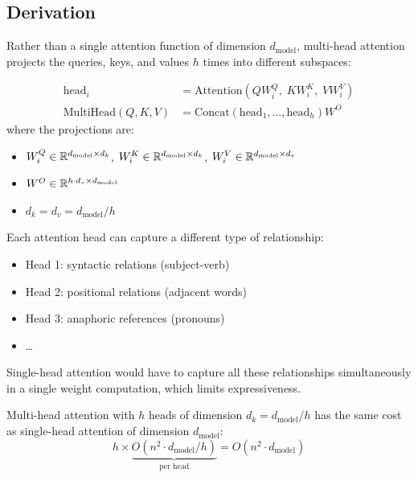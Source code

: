 \subsection{Derivation}

Rather than a single attention function of dimension $d_{\text{model}}$,
multi-head attention projects the queries, keys, and values $h$ times into
different subspaces:

\begin{keyformulas}[title=\textbf{Multi-head attention}]
\begin{align}
\text{head}_i &= \text{Attention}(Q W_i^Q,\; K W_i^K,\; V W_i^V)
\label{eq:head-i} \\
\text{MultiHead}(Q, K, V) &= \text{Concat}(\text{head}_1, \ldots, \text{head}_h) W^O
\label{eq:multi-head}
\end{align}
where the projections are:
\begin{itemize}
  \item $W_i^Q \in \mathbb{R}^{d_{\text{model}} \times d_k}$, \quad
        $W_i^K \in \mathbb{R}^{d_{\text{model}} \times d_k}$, \quad
        $W_i^V \in \mathbb{R}^{d_{\text{model}} \times d_v}$
  \item $W^O \in \mathbb{R}^{h \cdot d_v \times d_{\text{model}}}$
  \item $d_k = d_v = d_{\text{model}} / h$
\end{itemize}
\end{keyformulas}

\begin{intuition}[title=\textbf{Why multiple heads?}]
Each attention head can capture a different type of relationship:
\begin{itemize}
  \item Head 1: syntactic relations (subject-verb)
  \item Head 2: positional relations (adjacent words)
  \item Head 3: anaphoric references (pronouns)
  \item \ldots
\end{itemize}
Single-head attention would have to capture all these relationships
simultaneously in a single weight computation, which limits expressiveness.
\end{intuition}

\begin{remark}
Multi-head attention with $h$ heads of dimension $d_k = d_{\text{model}}/h$
has the same cost as single-head attention of dimension $d_{\text{model}}$:
\begin{equation}
h \times \underbrace{O(n^2 \cdot d_{\text{model}}/h)}_{\text{per head}}
= O(n^2 \cdot d_{\text{model}})
\end{equation}
\end{remark}


